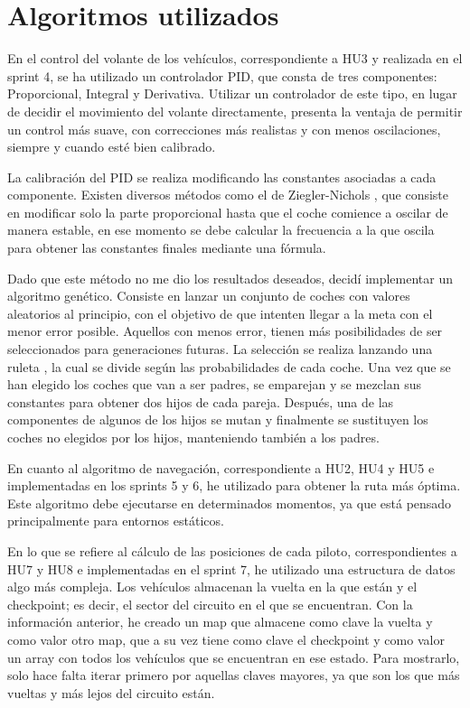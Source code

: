 \section{Algoritmos utilizados}
En el control del volante de los vehículos, correspondiente a HU3 y realizada en el sprint 4, se ha utilizado un controlador PID, que consta de tres componentes: Proporcional, Integral y Derivativa. Utilizar un controlador de este tipo, en lugar de decidir el movimiento del volante directamente, presenta la ventaja de permitir un control más suave, con correcciones más realistas y con menos oscilaciones, siempre y cuando esté bien calibrado.

\bigskip

La calibración del PID se realiza modificando las constantes asociadas a cada componente. Existen diversos métodos como el de Ziegler-Nichols \cite{enwiki:1140258750}, que consiste en modificar solo la parte proporcional hasta que el coche comience a oscilar de manera estable, en ese momento se debe calcular la frecuencia a la que oscila para obtener las constantes finales mediante una fórmula. 

\bigskip

Dado que este método no me dio los resultados deseados, decidí implementar un algoritmo genético. Consiste en lanzar un conjunto de coches con valores aleatorios al principio, con el objetivo de que intenten llegar a la meta con el menor error posible. Aquellos con menos error, tienen más posibilidades de ser seleccionados para generaciones futuras. La selección se realiza lanzando una ruleta \cite{enwiki:1141636554}, la cual se divide según las probabilidades de cada coche. Una vez que se han elegido los coches que van a ser padres, se emparejan y se mezclan sus constantes para obtener dos hijos de cada pareja. Después, una de las componentes de algunos de los hijos se mutan y finalmente se sustituyen los coches no elegidos por los hijos, manteniendo también a los padres.

\bigskip

En cuanto al algoritmo de navegación, correspondiente a HU2, HU4 y HU5 e implementadas en los sprints 5 y 6, he utilizado \finalAlg para obtener la ruta más óptima. Este algoritmo debe ejecutarse en determinados momentos, ya que está pensado principalmente para entornos estáticos.

\bigskip

En lo que se refiere al cálculo de las posiciones de cada piloto, correspondientes a HU7 y HU8 e implementadas en el sprint 7, he utilizado una estructura de datos algo más compleja. Los vehículos almacenan la vuelta en la que están y el checkpoint; es decir, el sector del circuito en el que se encuentran. Con la información anterior, he creado un map que almacene como clave la vuelta y como valor otro map, que a su vez tiene como clave el checkpoint y como valor un array con todos los vehículos que se encuentran en ese estado. Para mostrarlo, solo hace falta iterar primero por aquellas claves mayores, ya que son los que más vueltas y más lejos del circuito están.

